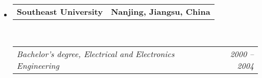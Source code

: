 \documentclass[10pt,letterpaper]{article}
\makeatletter
\newcommand{\headerrow}[2]
{\begin{tabular*}{\linewidth}{l@{\extracolsep{\fill}}r}
	#1 &
	#2 \\
\end{tabular*}}
\makeatother
\begin{document}
\begin{itemize}
	\item 
	\headerrow
		{\textbf{Southeast University}}
		{\textbf{Nanjing, Jiangsu, China}}
	\\
	\headerrow
		{\emph{Bachelor's degree, Electrical and Electronics Engineering}}
		{\emph{2000 -- 2004}}
\end{itemize}
\end{document}
